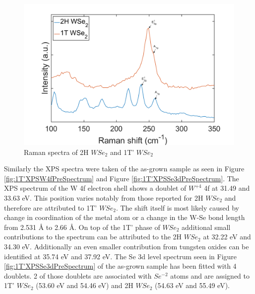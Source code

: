 \begin{figure}[!h]
	\begin{center}
		\includegraphics[scale=0.3]{1T'/RamanSpectraComparison.png}
		\caption{Raman spectra of 2H $WSe_2$ and 1T' $WSe_2$}
		\label{fig:1T'RamanSpectraComparison}
	\end{center}
\end{figure}

Similarly the XPS spectra were taken of the as-grown sample as seen in Figure \ref{fig:1T'XPSW4fPreSpectrum} and Figure \ref{fig:1T'XPSSe3dPreSpectrum}. The XPS spectrum of the W 4f electron shell shows a doublet of $W^{+4}$ 4f at 31.49 and 33.63 eV. This position varies notably from those reported for 2H $WSe_2$ and therefore are attributed to 1T' $WSe_2$. The shift itself is most likely caused by change in coordination of the metal atom or a change in the W-Se bond length from 2.531 \r{A} to 2.66 \r{A}. On top of the 1T' phase of $WSe_2$ additional small contributions to the spectrum can be attributed to the 2H $WSe_2$ at 32.22 eV and 34.30 eV. Additionally an even smaller contribution from tungsten oxides can be identified at 35.74 eV and 37.92 eV. The Se 3d level spectrum seen in Figure \ref{fig:1T'XPSSe3dPreSpectrum} of the as-grown sample has been fitted with 4 doublets. 2 of those doublets are associated with $Se^{-2}$ atoms and are assigned to 1T' $WSe_2$ (53.60 eV and 54.46 eV) and 2H $WSe_2$ (54.63 eV and 55.49 eV).

